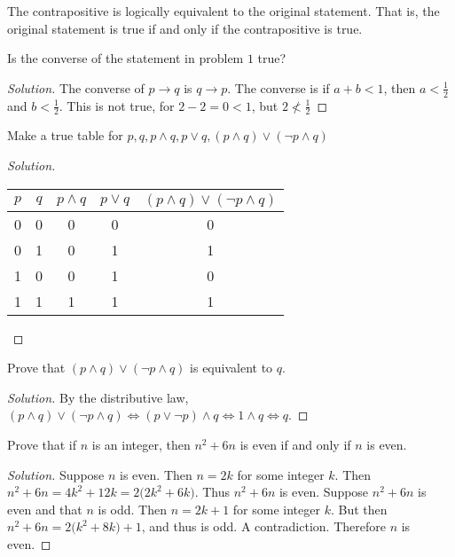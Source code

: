 \documentclass[../main.tex]{subfiles}
\begin{document}
\begin{remark}
The contrapositive is logically equivalent to the original statement. That is, the original statement is true if and only if the contrapositive is true.
\end{remark}

\begin{problem}
Is the converse of the statement in problem $1$ true?
\end{problem}
\begin{proof}[Solution]
The converse of $p\rightarrow q$ is $q\rightarrow p$. The converse is if $a+b <1$, then $a<\frac{1}{2}$ and $b< \frac{1}{2}$. This is not true, for $2-2 = 0 < 1$, but $2\not<\frac{1}{2}$
\end{proof}

\begin{problem}
Make a true table for $p,q,p\land q, p\lor q, (p\land q)\lor (\neg p\land q)$
\end{problem}
\begin{proof}[Solution]
\begin{center}
 \begin{tabular}{c c c c c} 
 \hline
 $p$ & $q$ & $p\land q$ & $p\lor q$ & $(p\land q)\lor(\neg p\land q)$ \\ [0.5ex] 
 \hline
 0 & 0 & 0 & 0 & 0\\ 
 0 & 1 & 0 & 1 & 1  \\
 1 & 0 & 0 & 1 & 0 \\
 1 & 1 & 1 & 1 & 1 \\
 \hline
\end{tabular}
\end{center}
\end{proof}

\begin{problem}
Prove that $(p\land q)\lor(\neg p\land q)$ is equivalent to $q$.
\end{problem}
\begin{proof}[Solution]
By the distributive law, $(p\land q)\lor(\neg p\land q) \Leftrightarrow (p\lor \neg p)\land q \Leftrightarrow 1\land q \Leftrightarrow q$.
\end{proof}

\begin{problem}
Prove that if $n$ is an integer, then $n^2+6n$ is even if and only if $n$ is even.
\end{problem}
\begin{proof}[Solution]
Suppose $n$ is even. Then $n=2k$ for some integer $k$. Then $n^2+6n = 4k^2+12k = 2\big(2k^2+6k)$. Thus $n^2+6n$ is even. Suppose $n^2+6n$ is even and that $n$ is odd. Then $n=2k+1$ for some integer $k$. But then $n^2+6n = 2\big(k^2+8k)+1$, and thus is odd. A contradiction. Therefore $n$ is even.
\end{proof}
\end{document}
